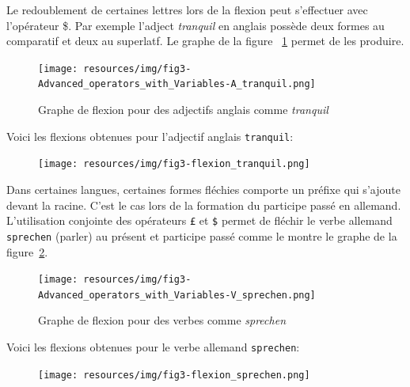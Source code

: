 \bigskip
\noindent
Le redoublement de certaines lettres lors de la flexion peut s'effectuer avec l'opérateur \$.
Par exemple l'adject {\it tranquil} en anglais possède deux formes au comparatif et deux au
superlatf. Le graphe de la figure ~\ref{fig-inflection-tranquil} permet de les produire.

\bigskip
\begin{figure}[!ht]
\begin{center}
\texttt{[image: resources/img/fig3-Advanced\_operators\_with\_Variables-A\_tranquil.png]}
\caption{Graphe de flexion pour des adjectifs anglais comme {\it tranquil}
\label{fig-inflection-tranquil}}
\end{center}
\end{figure}

\noindent Voici les flexions obtenues pour l'adjectif anglais \verb+tranquil+:

\bigskip
\begin{figure}[!ht]
\begin{center}
\texttt{[image: resources/img/fig3-flexion\_tranquil.png]}
\end{center}
\end{figure}

\noindent Dans certaines langues, certaines formes fléchies comporte un préfixe qui s'ajoute devant la racine.
C'est le cas lors de la formation du participe passé en allemand. L'utilisation conjointe des
opérateurs \verb+£+ et \verb+$+ permet de fléchir le verbe allemand \verb+sprechen+ (parler)
au présent et participe passé comme le montre le graphe de la figure~\ref{fig-inflection-sprechen}.

\newpage
\begin{figure}[!htbp]
\begin{center}
\texttt{[image: resources/img/fig3-Advanced\_operators\_with\_Variables-V\_sprechen.png]}
\caption{Graphe de flexion pour des verbes comme {\it sprechen}
\label{fig-inflection-sprechen}}
\end{center}
\end{figure}

\noindent Voici les flexions obtenues pour le verbe allemand \verb+sprechen+:

\bigskip
\begin{figure}[!ht]
\begin{center}
\texttt{[image: resources/img/fig3-flexion\_sprechen.png]}
\end{center}
\end{figure}

